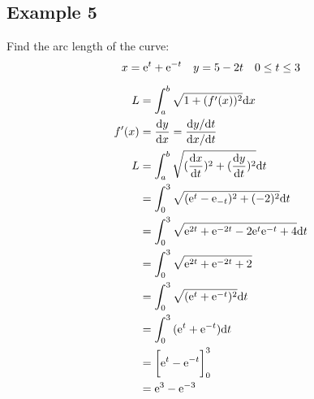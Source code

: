 \documentclass{math}
\begin{document}
\subsection*{Example 5}
Find the arc length of the curve:
\[ x = \mathrm{e}^{t}+\mathrm{e}^{-t} \quad y = 5-2t \quad 0 \leq t \leq 3 \]
\begin{center}
\end{center}
\begin{align*}
  L &= \int_{a}^{b}{\sqrt{1+(f'(x))^{2}}\mathrm{d}{x}} \\
  f'(x) &= \frac{\mathrm{d}{y}}{\mathrm{d}{x}} =
    \frac{\mathrm{d}{y}/\mathrm{d}{t}}{\mathrm{d}{x}/\mathrm{d}{t}} \\
  L &= \int_{a}^{b}{\sqrt{(\frac{\mathrm{d}{x}}{\mathrm{d}{t}})^{2}+
      (\frac{\mathrm{d}{y}}{\mathrm{d}{t}})^{2}}\mathrm{d}{t}} \\
  &= \int_{0}^{3}{\sqrt{(\mathrm{e}^{t}-\mathrm{e}_{-t})^{2}+(-2)^{2}}\mathrm{d}{t}} \\
  &= \int_{0}^{3}{\sqrt{\mathrm{e}^{2t}+\mathrm{e}^{-2t}-2\mathrm{e}^{t}\mathrm{e}^{-t}+4}\mathrm{d}{t}} \\
  &= \int_{0}^{3}{\sqrt{\mathrm{e}^{2t}+\mathrm{e}^{-2t}+2}} \\
  &= \int_{0}^{3}{\sqrt{(\mathrm{e}^{t}+\mathrm{e}^{-t})^{2}}\mathrm{d}{t}} \\
  &= \int_{0}^{3}{(\mathrm{e}^{t}+\mathrm{e}^{-t})\mathrm{d}{t}} \\
  &= \bigg[\mathrm{e}^{t}-\mathrm{e}^{-t}\bigg]_{0}^{3} \\
  &= \mathrm{e}^{3}-\mathrm{e}^{-3}
\end{align*}
\end{document}
